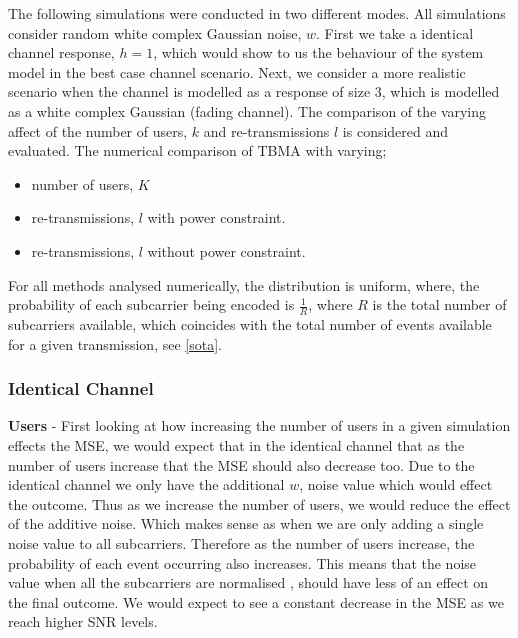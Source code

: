 \documentclass{article}
\begin{document}
The following simulations were conducted in two different modes. All simulations consider random white complex Gaussian noise, $w$. First we take a identical channel response, $h=1$, which would show to us the behaviour of the system model in the best case channel scenario. Next, we consider a more realistic scenario when the channel is modelled as a response of size 3, which is modelled as a white complex Gaussian (fading channel). The comparison of the varying affect of the number of users, $k$ and re-transmissions $l$ is considered and evaluated. 
The numerical comparison of TBMA with varying;
\begin{itemize}
    \item number of users, $K$
    \item re-transmissions, $l$ with power constraint.    
    \item re-transmissions, $l$ without power constraint.
\end{itemize}

For all methods analysed numerically, the distribution is uniform, where, the probability of each subcarrier being encoded is $\frac{1}{R}$, where $R$ is the total number of subcarriers available, which coincides with the total number of events available for a given transmission, see \cref{sota}. 
  
\subsubsection{Identical Channel}

\textbf{Users} - First looking at how increasing the number of users in a given simulation effects the \ac{MSE}, we would expect that in the identical channel that as the number of users increase that the  \ac{MSE} should also decrease too. Due to the identical channel we only have the additional $w$, noise value which would effect the outcome. Thus as we increase the number of users, we would reduce the effect of the additive noise. Which makes sense as when we are only adding a single noise value to all subcarriers. Therefore as the number of users increase, the probability of each event occurring also increases. This means that the noise value when all the subcarriers are normalised , should have less of an effect on the final outcome.  We would expect to see a constant decrease in the MSE as we reach higher SNR levels. 
\end{document}

